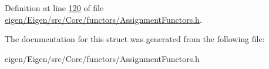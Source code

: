 Definition at line \hyperlink{eigen_2_eigen_2src_2_core_2functors_2_assignment_functors_8h_source_l00120}{120} of file \hyperlink{eigen_2_eigen_2src_2_core_2functors_2_assignment_functors_8h_source}{eigen/\+Eigen/src/\+Core/functors/\+Assignment\+Functors.\+h}.



The documentation for this struct was generated from the following file\+:\begin{DoxyCompactItemize}
\item 
eigen/\+Eigen/src/\+Core/functors/\+Assignment\+Functors.\+h\end{DoxyCompactItemize}
